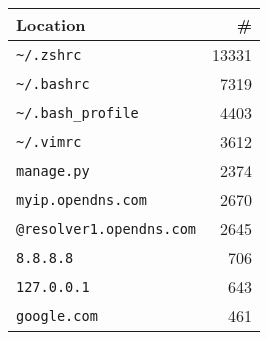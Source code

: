 \begin{tabular}{lr}
    \toprule
    Location & \# \\        
    \midrule
    \verb|~/.zshrc|         &   \num{13331} \\
    \verb|~/.bashrc|        &   \num{7319} \\
    \verb|~/.bash_profile|  &   \num{4403} \\
    \verb|~/.vimrc|         &   \num{3612} \\
    \verb|manage.py|        &   \num{2374} \\
    \midrule
    \verb|myip.opendns.com|         &   \num{2670} \\
    \verb|@resolver1.opendns.com|   &   \num{2645} \\
    \verb|8.8.8.8|                  &   \num{706} \\
    \verb|127.0.0.1|                &   \num{643} \\
    \verb|google.com|               &   \num{461} \\
    \bottomrule
\end{tabular}